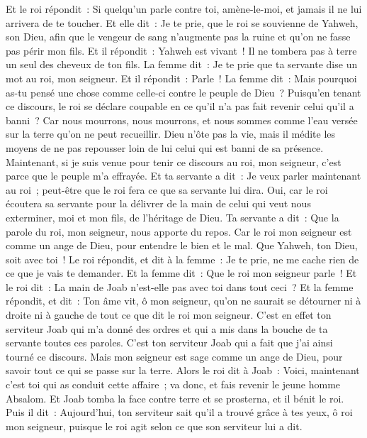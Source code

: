 \begin{multicols}{2}
Et le roi répondit~: Si quelqu'un parle contre toi, amène-le-moi, et jamais il ne lui arrivera de te toucher.
Et elle dit~: Je te prie, que le roi se souvienne de Yahweh, son Dieu, afin que le vengeur de sang n'augmente pas la ruine et qu'on ne fasse pas périr mon fils. Et il répondit~: Yahweh est vivant~! Il ne tombera pas à terre un seul des cheveux de ton fils.
La femme dit~: Je te prie que ta servante dise un mot au roi, mon seigneur. Et il répondit~: Parle~!
La femme dit~: Mais pourquoi as-tu pensé une chose comme celle-ci contre le peuple de Dieu~? Puisqu'en tenant ce discours, le roi se déclare coupable en ce qu'il n'a pas fait revenir celui qu'il a banni~?
Car nous mourrons, nous mourrons, et nous sommes comme l'eau versée sur la terre qu'on ne peut recueillir. Dieu n'ôte pas la vie, mais il médite les moyens de ne pas repousser loin de lui celui qui est banni de sa présence.
Maintenant, si je suis venue pour tenir ce discours au roi, mon seigneur, c'est parce que le peuple m'a effrayée. Et ta servante a dit~: Je veux parler maintenant au roi~; peut-être que le roi fera ce que sa servante lui dira.
Oui, car le roi écoutera sa servante pour la délivrer de la main de celui qui veut nous exterminer, moi et mon fils, de l'héritage de Dieu.
Ta servante a dit~: Que la parole du roi, mon seigneur, nous apporte du repos. Car le roi mon seigneur est comme un ange de Dieu, pour entendre le bien et le mal. Que Yahweh, ton Dieu, soit avec toi~!
Le roi répondit, et dit à la femme~: Je te prie, ne me cache rien de ce que je vais te demander. Et la femme dit~: Que le roi mon seigneur parle~!
Et le roi dit~: La main de Joab n'est-elle pas avec toi dans tout ceci~? Et la femme répondit, et dit~: Ton âme vit, ô mon seigneur, qu'on ne saurait se détourner ni à droite ni à gauche de tout ce que dit le roi mon seigneur. C'est en effet ton serviteur Joab qui m'a donné des ordres et qui a mis dans la bouche de ta servante toutes ces paroles.
C'est ton serviteur Joab qui a fait que j'ai ainsi tourné ce discours. Mais mon seigneur est sage comme un ange de Dieu, pour savoir tout ce qui se passe sur la terre.
Alors le roi dit à Joab~: Voici, maintenant c'est toi qui as conduit cette affaire~; va donc, et fais revenir le jeune homme Absalom.
Et Joab tomba la face contre terre et se prosterna, et il bénit le roi. Puis il dit~: Aujourd'hui, ton serviteur sait qu'il a trouvé grâce à tes yeux, ô roi mon seigneur, puisque le roi agit selon ce que son serviteur lui a dit.

\end{multicols}
